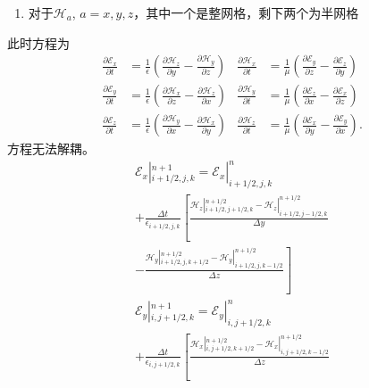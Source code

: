 \documentclass{article}
\newcommand{\nobracket}{}
\begin{document}
\begin{CJK*}{UTF8}{gbsn}
\begin{enumerate}
  \item 对于$\mathscr{H}_a$, $a = x, y,
  z$，其中一个是整网格，剩下两个为半网格
\end{enumerate}
此时方程为
\[ \begin{array}{llll}
     \frac{\partial \mathscr{E}_x}{\partial t} & = \frac{1}{\epsilon}  \left(
     \frac{\partial \mathscr{H}_z}{\partial y} - \frac{\partial
     \mathscr{H}_y}{\partial z} \right) & \frac{\partial
     \mathscr{H}_x}{\partial t} & = \frac{1}{\mu}  \left( \frac{\partial
     \mathscr{E}_y}{\partial z} - \frac{\partial \mathscr{E}_z}{\partial y}
     \right)\\
     \frac{\partial \mathscr{E}_y}{\partial t} & = \frac{1}{\epsilon}  \left(
     \frac{\partial \mathscr{H}_x}{\partial z} - \frac{\partial
     \mathscr{H}_z}{\partial x} \right) & \frac{\partial
     \mathscr{H}_y}{\partial t} & = \frac{1}{\mu}  \left( \frac{\partial
     \mathscr{E}_z}{\partial x} - \frac{\partial \mathscr{E}_x}{\partial z}
     \right)\\
     \frac{\partial \mathscr{E}_z}{\partial t} & = \frac{1}{\epsilon}  \left(
     \frac{\partial \mathscr{H}_y}{\partial x} - \frac{\partial
     \mathscr{H}_x}{\partial y} \right) & \frac{\partial
     \mathscr{H}_z}{\partial t} & = \frac{1}{\mu}  \left( \frac{\partial
     \mathscr{E}_x}{\partial y} - \frac{\partial \mathscr{E}_y}{\partial x}
     \right) .
   \end{array} \]
方程无法解耦。
\[ \begin{array}{l}
     \nobracket \mathscr{E}_x |_{i + 1 / 2, j, k}^{n + 1} = \nobracket
     \mathscr{E}_x |_{i + 1 / 2, j, k}^n\\
     + \frac{\Delta t}{\epsilon_{i + 1 / 2, j, k}} \left[ \frac{\nobracket
     \mathscr{H}_z |_{i + 1 / 2, j + 1 / 2, k}^{n + 1 / 2} - \nobracket
     \mathcal{H}_z |_{i + 1 / 2, j - 1 / 2, k}^{n + 1 / 2}}{\Delta y}
     \right.\\
     \left. - \frac{\nobracket \mathcal{H}_y |_{i + 1 / 2, j, k + 1 / 2}^{n +
     1 / 2} - \nobracket \mathcal{H}_y |_{i + 1 / 2, j, k - 1 / 2}^{n + 1 /
     2}}{\Delta z} \right]\\
     \nobracket \mathscr{E}_y |_{i, j + 1 / 2, k}^{n + 1} = \nobracket
     \mathscr{E}_y |_{i, j + 1 / 2, k}^n\\
     + \frac{\Delta t}{\epsilon_{i, j + 1 / 2, k}} \left[ \frac{\nobracket
     \mathscr{H}_x |_{i, j + 1 / 2, k + 1 / 2}^{n + 1 / 2} - \nobracket
     \mathcal{H}_x |_{i, j + 1 / 2, k - 1 / 2}^{n + 1 / 2}}{\Delta z}
     \right.\\

\end{array}\]
\end{CJK*}
\end{document}
